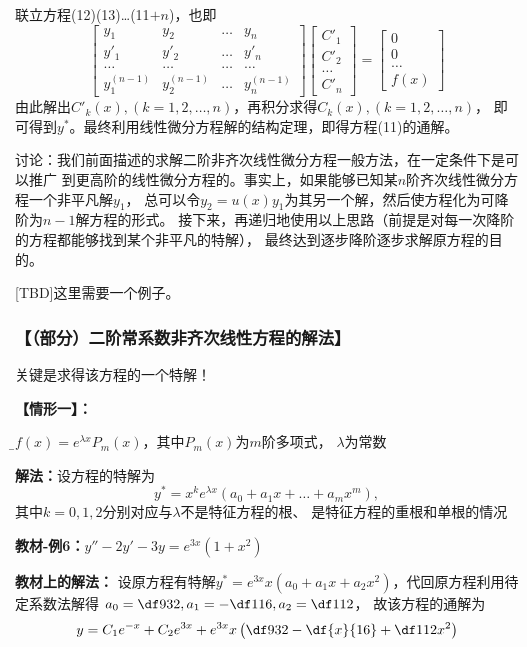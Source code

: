 \begin{shaded}
	联立方程(12)(13)\ldots(11$+n$)，也即
	$$\left[\begin{array}{cccc}
	y_1 & y_2 & \ldots & y_n\\
	y'_1 & y'_2 & \ldots & y'_n\\
	\ldots & \ldots & \ldots &\ldots\\
	y^{(n-1)}_1 & y^{(n-1)}_2 & \ldots & y^{(n-1)}_n
	\end{array}
	\right]
	\left[\begin{array}{c}
	C'_1 \\ C'_2 \\ \ldots \\ C'_n 
	\end{array}\right]
	=\left[\begin{array}{c}
	0 \\ 0 \\ \ldots \\ f(x)
	\end{array}\right]$$
	由此解出$C'_k(x),(k=1,2,\ldots,n)$，再积分求得$C_k(x),(k=1,2,\ldots,n)$，
	即可得到$y^*$。最终利用线性微分方程解的结构定理，即得方程(11)的通解。
	
	
	讨论：我们前面描述的求解二阶非齐次线性微分方程一般方法，在一定条件下是可以推广
	到更高阶的线性微分方程的。事实上，如果能够已知某$n$阶齐次线性微分方程一个非平凡解$y_1$，
	总可以令$y_2=u(x)y_1$为其另一个解，然后使方程化为可降阶为$n-1$解方程的形式。
	接下来，再递归地使用以上思路（前提是对每一次降阶的方程都能够找到某个非平凡的特解），
	最终达到逐步降阶逐步求解原方程的目的。
	
	[TBD]这里需要一个例子。
\end{shaded}

\subsubsection{【（部分）二阶常系数非齐次线性方程的解法】}

关键是求得该方程的一个特解！

{\bf 【情形一】：}{\b$f(x)=e^{\lambda x}P_m(x)$，其中$P_m(x)$为$m$阶多项式，
$\lambda$为常数

{\bf 解法：}设方程的特解为
$$y^*=x^ke^{\lambda x}(a_0+a_1x+\ldots+a_mx^m),$$
其中$k=0,1,2$分别对应与$\lambda$不是特征方程的根、
是特征方程的重根和单根的情况}


{\bf 教材-例6：}$y''-2y'-3y=e^{3x}(1+x^2)$

{\bf 教材上的解法：}
设原方程有特解$y^*=e^{3x}x(a_0+a_1x+a_2x^2)$，代回原方程利用待定系数法解得
$a_0=\df9{32},a_1=-\df1{16},a_2=\df1{12}$，
故该方程的通解为
$$y=C_1e^{-x}+C_2e^{3x}+e^{3x}x\left(\df9{32}-\df{x}{16}+\df1{12}x^2\right)$$

